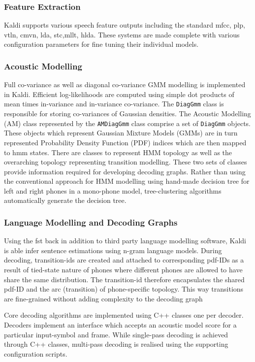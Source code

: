 \subsubsection{Feature Extraction}
Kaldi supports various speech feature outputs including the standard \acrfull{mfcc}, \acrfull{plp}, \acrfull{vtln}, \acrfull{cmvn}, \acrfull{lda}, \acrfull{stc},\acrfull{mllt}, \acrfull{hlda}.  These systems are made complete with various configuration parameters for fine tuning their individual models.
\subsubsection{Acoustic Modelling}
Full co-variance as well as diagonal co-variance GMM modelling is implemented in Kaldi. Efficient log-likelihoods are computed using simple dot products of mean times in-variance and in-variance co-variance.  The \texttt{DiagGmm} class is responsible for storing co-variances of Gaussian densities. The Acoustic Modelling (AM) class represented by the \texttt{AMDiagGmm} class comprise a set of \texttt{DiagGmm} objects.  These objects which represent Gaussian Mixture Models (GMMs) are in turn represented Probability Density Function (PDF) indices which are then mapped to \acrfull{hmm} states. There are classes to represent HMM topology as well as the overarching topology representing transition modelling. These two sets of classes provide information required for developing decoding graphs.  Rather than using the conventional approach for HMM modelling using hand-made decision tree for left and right phones in a mono-phone model, tree-clustering algorithms automatically generate the decision tree.

\subsubsection{Language Modelling and Decoding Graphs}
Using the \acrfull{fst} back in addition to third party language modelling software, Kaldi is able infer sentence estimations using n-gram language models. During decoding, transition-ids are created and attached to corresponding pdf-IDs as a result of tied-state nature of phones where different phones are allowed to have share the same distribution.  The transition-id therefore encapsulates the shared pdf-ID and the arc (transition) of phone-specific topology. This way transitions are fine-grained without adding complexity to the decoding graph

Core decoding algorithms are implemented using C++ classes one per decoder.  Decoders implement an interface which accepts an acoustic model score for a particular input-symbol and frame.  While single-pass decoding is achieved through C++ classes, multi-pass decoding is realised using the supporting configuration scripts.

